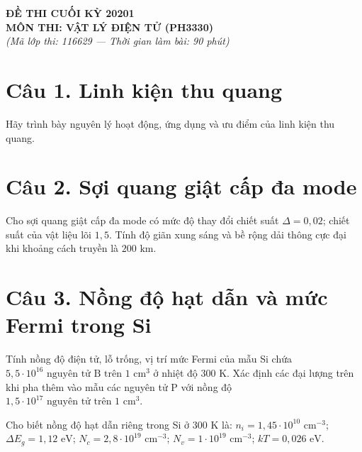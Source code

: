 \documentclass[11pt,a4paper]{article}
\begin{document}
\begin{center}
    {\Large\bfseries ĐỀ THI CUỐI KỲ 20201}\\[0.2cm]
    {\bfseries MÔN THI: VẬT LÝ ĐIỆN TỬ (PH3330)}\\[0.15cm]
    \textit{(Mã lớp thi: 116629 --- Thời gian làm bài: 90 phút)}
\end{center}
\vspace{0.2cm}

\section*{Câu 1. Linh kiện thu quang}

Hãy trình bày nguyên lý hoạt động, ứng dụng và ưu điểm của linh kiện thu quang.

\vspace{0.5cm}

\section*{Câu 2. Sợi quang giật cấp đa mode}

Cho sợi quang giật cấp đa mode có mức độ thay đổi chiết suất $\Delta = 0{,}02$; chiết suất của vật liệu lõi $1{,}5$. Tính độ giãn xung sáng và bề rộng dải thông cực đại khi khoảng cách truyền là $200\text{ km}$.

\vspace{0.5cm}

\section*{Câu 3. Nồng độ hạt dẫn và mức Fermi trong Si}

Tính nồng độ điện tử, lỗ trống, vị trí mức Fermi của mẫu Si chứa $5{,}5 \cdot 10^{16}\text{ nguyên tử B trên } 1\text{ cm}^3$ ở nhiệt độ $300\text{ K}$. Xác định các đại lượng trên khi pha thêm vào mẫu các nguyên tử P với nồng độ $1{,}5 \cdot 10^{17}\text{ nguyên tử trên } 1\text{ cm}^3$.

Cho biết nồng độ hạt dẫn riêng trong Si ở $300\text{ K}$ là: $n_i = 1{,}45 \cdot 10^{10}\text{ cm}^{-3}$; $\Delta E_g = 1{,}12\text{ eV}$; $N_c = 2{,}8 \cdot 10^{19}\text{ cm}^{-3}$; $N_v = 1 \cdot 10^{19}\text{ cm}^{-3}$; $kT = 0{,}026\text{ eV}$.
\end{document}
